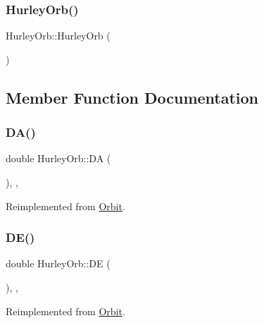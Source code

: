 \subsubsection{\texorpdfstring{Hurley\+Orb()}{HurleyOrb()}}
{\footnotesize\ttfamily Hurley\+Orb\+::\+Hurley\+Orb (\begin{DoxyParamCaption}{ }\end{DoxyParamCaption})\hspace{0.3cm}{\ttfamily [inline]}}



\subsection{Member Function Documentation}
\mbox{\label{class_hurley_orb_af4ef7b4bd24e22e010b96f7bc6d872f6}} 
\subsubsection{\texorpdfstring{D\+A()}{DA()}}
{\footnotesize\ttfamily double Hurley\+Orb\+::\+DA (\begin{DoxyParamCaption}{ }\end{DoxyParamCaption})\hspace{0.3cm}{\ttfamily [override]}, {\ttfamily [private]}, {\ttfamily [virtual]}}



Reimplemented from \hyperlink{class_orbit_a258deda1207d23b2ce6285b55e216d4f}{Orbit}.

\mbox{\label{class_hurley_orb_ad0c599c31dad0585d007c08eb22cbc89}} 
\subsubsection{\texorpdfstring{D\+E()}{DE()}}
{\footnotesize\ttfamily double Hurley\+Orb\+::\+DE (\begin{DoxyParamCaption}{ }\end{DoxyParamCaption})\hspace{0.3cm}{\ttfamily [override]}, {\ttfamily [private]}, {\ttfamily [virtual]}}



Reimplemented from \hyperlink{class_orbit_a9bac8077719791b75d0c962428f8e1b4}{Orbit}.

